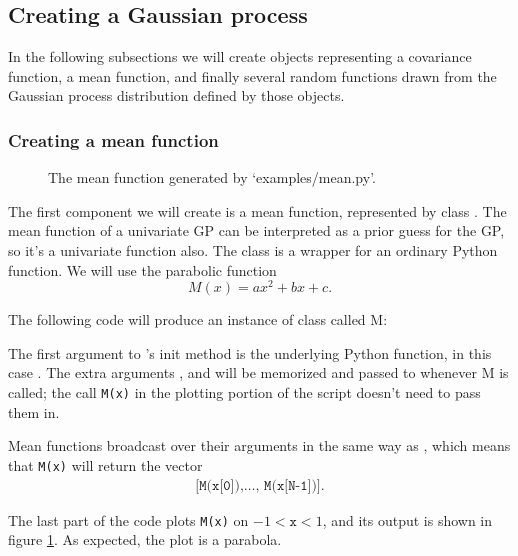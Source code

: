\subsection{Creating a Gaussian process}\label{sub:inst}

In the following subsections we will create objects representing a covariance function, a mean function, and finally several random functions drawn from the Gaussian process distribution defined by those objects.

\subsubsection{Creating a mean function}\label{subsub:mean}

\begin{figure}
    \centering
    \caption{The mean function generated by {\sffamily `examples/mean.py'}.}
    \label{fig:mean}
\end{figure}

The first component we will create is a mean function, represented by class . The mean function of a univariate GP can be interpreted as a prior guess for the GP, so it's a univariate function also. The  class is a wrapper for an ordinary Python function. We will use the parabolic function
\begin{equation}
    M(x) = ax^2 + bx + c.
\end{equation}

The following code will produce an instance of class  called M:


The first argument to 's init method is the underlying Python function, in this case . The extra arguments ,   and  will be memorized and passed to  whenever M is called; the call \texttt{M(x)} in the plotting portion of the script doesn't need to pass them in.

Mean functions broadcast over their arguments in the same way as  \cite{numpybook}, which means that \texttt{M(x)} will return the vector
\begin{eqnarray*}
    \texttt{[M(x[0]),\ldots, M(x[N-1])]}.
\end{eqnarray*}

The last part of the code plots \texttt{M(x)} on $-1<\texttt{x}<1$, and its output is shown in figure \ref{fig:mean}. As expected, the plot is a parabola.


